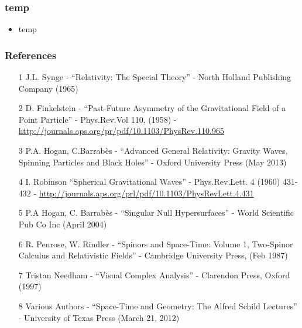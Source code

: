 \documentclass[10pt,a4paper]{beamer}
\begin{document}
\begin{frame}
\frametitle{temp}
\begin{itemize}
\item<1->{temp}
\end{itemize}

\end{frame}
















\begin{frame}
\frametitle{References}
\begin{itemize}
\item[1]{ J.L. Synge - ``Relativity: The Special Theory'' - North Holland Publishing Company (1965)}
\item[2]{ D. Finkelstein - ``Past-Future Asymmetry of the Gravitational Field of a Point Particle'' - Phys.Rev.Vol 110, (1958) - \url{http://journals.aps.org/pr/pdf/10.1103/PhysRev.110.965}}
\item[3]{ P.A. Hogan, C.Barrab\`es - ``Advanced General Relativity: Gravity Waves, Spinning Particles and Black Holes'' - Oxford University Press (May 2013)}
\item[4]{ I. Robinson ``Spherical Gravitational Waves'' - Phys.Rev.Lett. 4 (1960) 431-432 - \url{http://journals.aps.org/prl/pdf/10.1103/PhysRevLett.4.431}}
\item[5]{ P.A Hogan, C. Barrab\`es - ``Singular Null Hypersurfaces'' - World Scientific Pub Co Inc (April 2004)}
\item[6]{ R. Penrose, W. Rindler - ``Spinors and Space-Time: Volume 1, Two-Spinor Calculus and Relativistic Fields'' - Cambridge University Press, (Feb 1987)}
\item[7]{ Tristan Needham - ``Visual Complex Analysis'' - Clarendon Press, Oxford (1997)}
\item[8]{ Various Authors - ``Space-Time and Geometry: The Alfred Schild Lectures'' - University of Texas Press (March 21, 2012)}
\end{itemize}
\end{frame}
\end{document}
